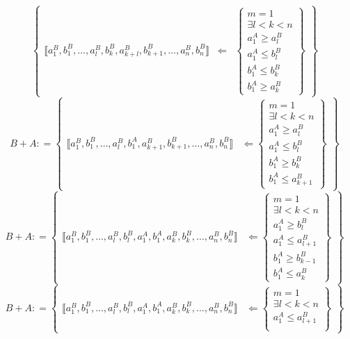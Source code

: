 \begin{enumerate}
\[\begin{Bmatrix}
  {⟦{{a_{1}^{B},b_{1}^{B}},\ldots,{a_{l}^{B},b_{k}^{B}},{a_{k + l}^{B},b_{k + 1}^{B}},\ldots,{a_{n}^{B},b_{n}^{B}}}⟧} & \Leftarrow & \begin{Bmatrix}
  {m = 1} \\
  {\exists{{l < k} < n}} \\
  {a_{1}^{A} \geq a_{l}^{B}} \\
  {a_{1}^{A} \leq b_{l}^{B}} \\
  {b_{1}^{A} \leq b_{k}^{B}} \\
  {b_{1}^{A} \geq a_{k}^{B}}
  \end{Bmatrix}
  \end{Bmatrix}\]\[{{B + A}{: =}}\begin{Bmatrix}
  {⟦{{a_{1}^{B},b_{1}^{B}},\ldots,{a_{l}^{B},b_{1}^{A}},{a_{k + 1}^{B},b_{k + 1}^{B}},\ldots,{a_{n}^{B},b_{n}^{B}}}⟧} & {\Leftarrow\begin{Bmatrix}
  {m = 1} \\
  {\exists{{l < k} < n}} \\
  {a_{1}^{A} \geq a_{l}^{B}} \\
  {a_{1}^{A} \leq b_{l}^{B}} \\
  {b_{1}^{A} \geq b_{k}^{B}} \\
  {b_{1}^{A} \leq a_{k + 1}^{B}}
  \end{Bmatrix}}
  \end{Bmatrix}\] \[{{B + A}{: =}}\begin{Bmatrix}
  {⟦{{a_{1}^{B},b_{1}^{B}},\ldots,{a_{l}^{B},b_{l}^{B}},{a_{1}^{A},b_{1}^{A}},{a_{k}^{B},b_{k}^{B}},\ldots,{a_{n}^{B},b_{n}^{B}}}⟧} & {\Leftarrow\begin{Bmatrix}
  {m = 1} \\
  {\exists{{l < k} < n}} \\
  {a_{1}^{A} \geq b_{l}^{B}} \\
  {a_{1}^{A} \leq a_{l + 1}^{B}} \\
  {b_{1}^{A} \geq b_{k - 1}^{B}} \\
  {b_{1}^{A} \leq a_{k}^{B}}
  \end{Bmatrix}}
  \end{Bmatrix}\]\[{{B + A}{: =}}\begin{Bmatrix}
  {⟦{{a_{1}^{B},b_{1}^{B}},\ldots,{a_{l}^{B},b_{l}^{B}},{a_{1}^{A},b_{1}^{A}},{a_{k}^{B},b_{k}^{B}},\ldots,{a_{n}^{B},b_{n}^{B}}}⟧} & {\Leftarrow\begin{Bmatrix}
  {m = 1} \\
  {\exists{{l < k} < n}} \\
  {a_{1}^{A} \leq a_{l + 1}^{B}} \\

\end{Bmatrix}}
\end{Bmatrix}\]
\end{enumerate}
